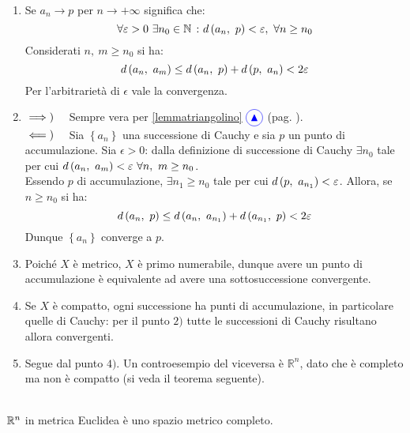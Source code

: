 \begin{demonstration}~{}
	\begin{enumerate}[label=\Roman*]
		\item Se $a_n\to p$ per $n\to +\infty$ significa che:
		\begin{equation*}
			\forall \epsilon>0\ \exists n_0\in\naturalset\ \colon \mvf{d}{a_n}{p}<\epsilon,\ \forall n\geq n_0
		\end{equation*}
	Considerati $n,\ m\geq n_0$ si ha:
	\begin{equation}
		d\left(a_n,\ a_m\right)\leq d\left(a_n,\ p\right)+d\left(p,\ a_n\right)< 2\varepsilon
	\end{equation}
Per l'arbitrarietà di $\epsilon$ vale la convergenza.
\item $\implies)\quad$ Sempre vera per  \ref{lemmatriangolino} $\textcolor{blue}{\circled{{\large \blacktriangle}}}$ (pag. \pageref{lemmatriangolino}).\\
$\impliedby)\quad$ Sia $\left\{a_n\right\}$ una successione di Cauchy e sia $p$ un punto di accumulazione. Sia $\epsilon>0$: dalla definizione di successione di Cauchy $\exists n_0$ tale per cui $\mvf{d}{a_n}{a_m}<\epsilon\ \forall n,\ m\geq n_0$.\\
Essendo $p$ di accumulazione, $\exists n_1\geq n_0$ tale per cui $d\left(p,\ a_{n_1}\right)<\varepsilon$. Allora, se $n\geq n_0$ si ha:
	\begin{equation*}
	d\left(a_n,\ p\right)\leq d\left(a_n,\ a_{n_1}\right)+d\left(a_{n_1},\ p\right)< 2\varepsilon
\end{equation*}
Dunque $\left\{a_n\right\}$ converge a $p$.
\item Poiché $X$ è metrico, $X$ è primo numerabile, dunque avere un punto di accumulazione è equivalente ad avere una sottosuccessione convergente.
\item Se $X$ è compatto, ogni successione ha punti di accumulazione, in particolare quelle di Cauchy: per il punto $2)$ tutte le successioni di Cauchy risultano allora convergenti.
\item Segue dal punto $4)$. Un controesempio del viceversa è $\mathbb{R}^n$, dato che è completo ma non è compatto (si veda il teorema seguente).
\end{enumerate}
\vspace{-3mm}
\end{demonstration}
\begin{theorema}~{}\\
	$\mathbb{R}^n$ in metrica Euclidea è uno spazio metrico completo.
\end{theorema}
